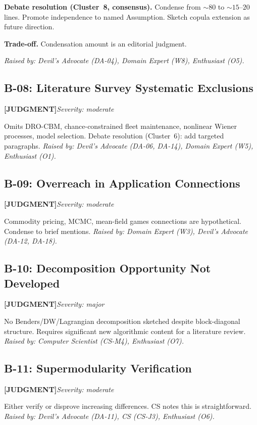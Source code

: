 \documentclass[11pt,a4paper]{article}
\newcommand{\judgmentlabel}{\textbf{\textcolor{judgmentorange}{[JUDGMENT]}}}
\begin{document}
\textbf{Debate resolution (Cluster~8, consensus).} Condense from ${\sim}80$ to ${\sim}15$--$20$ lines. Promote independence to named Assumption. Sketch copula extension as future direction.

\textbf{Trade-off.} Condensation amount is an editorial judgment.

\textit{Raised by: Devil's Advocate (DA-04), Domain Expert (W8), Enthusiast (O5).}

\bigskip


\subsection{B-08: Literature Survey Systematic Exclusions}
\judgmentlabel\quad\textit{Severity: moderate}

Omits DRO-CBM, chance-constrained fleet maintenance, nonlinear Wiener processes, model selection. Debate resolution (Cluster~6): add targeted paragraphs. \textit{Raised by: Devil's Advocate (DA-06, DA-14), Domain Expert (W5), Enthusiast (O1).}

\subsection{B-09: Overreach in Application Connections}
\judgmentlabel\quad\textit{Severity: moderate}

Commodity pricing, MCMC, mean-field games connections are hypothetical. Condense to brief mentions. \textit{Raised by: Domain Expert (W3), Devil's Advocate (DA-12, DA-18).}

\subsection{B-10: Decomposition Opportunity Not Developed}
\judgmentlabel\quad\textit{Severity: major}

No Benders/DW/Lagrangian decomposition sketched despite block-diagonal structure. Requires significant new algorithmic content for a literature review. \textit{Raised by: Computer Scientist (CS-M4), Enthusiast (O7).}

\subsection{B-11: Supermodularity Verification}
\judgmentlabel\quad\textit{Severity: moderate}

Either verify or disprove increasing differences. CS notes this is straightforward. \textit{Raised by: Devil's Advocate (DA-11), CS (CS-J3), Enthusiast (O6).}
\end{document}
